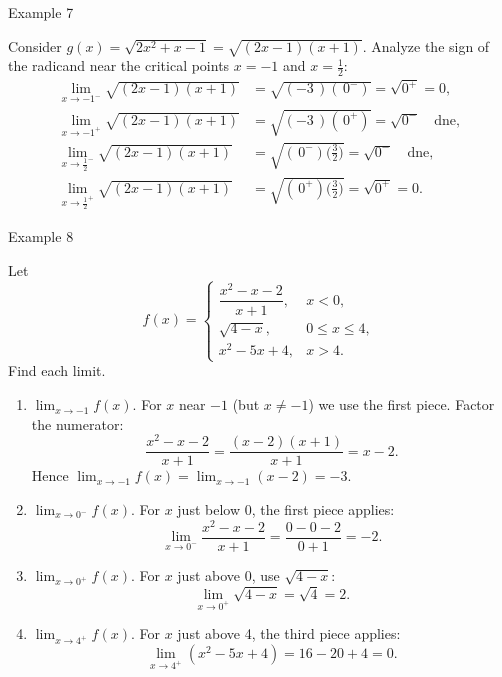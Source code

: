 \begin{examplebox}{Example 7}

Consider \(g(x) = \sqrt{2x^{2} + x - 1} = \sqrt{(2x - 1)(x + 1)}\). Analyze the sign of the radicand near the critical points \(x = -1\) and \(x = \frac{1}{2}\):
\begin{align*}
\lim_{x \to -1^{-}} \sqrt{(2x - 1)(x + 1)}
    &= \sqrt{ ( -3\,)(\,0^{-} ) } = \sqrt{0^{+}} = 0,\\[6pt]
\lim_{x \to -1^{+}} \sqrt{(2x - 1)(x + 1)}
    &= \sqrt{ ( -3\,)(\,0^{+} ) } = \sqrt{0^{-}} \quad \text{dne},\\[6pt]
\lim_{x \to \frac{1}{2}^{-}} \sqrt{(2x - 1)(x + 1)}
    &= \sqrt{ (\,0^{-} )\bigl(\tfrac{3}{2}\bigr) } = \sqrt{0^{-}} \quad \text{dne},\\[6pt]
\lim_{x \to \frac{1}{2}^{+}} \sqrt{(2x - 1)(x + 1)}
    &= \sqrt{ (\,0^{+} )\bigl(\tfrac{3}{2}\bigr) } = \sqrt{0^{+}} = 0.
\end{align*}
\end{examplebox}


\begin{examplebox}{Example 8}

Let
\[
f(x) = \begin{cases}
\dfrac{x^{2} - x - 2}{x + 1}, & x < 0, \\[10pt]
\sqrt{4 - x},                  & 0 \le x \le 4, \\[6pt]
x^{2} - 5x + 4,                & x > 4.
\end{cases}
\]
Find each limit.
\begin{enumerate}
    \item[(a)] \(\displaystyle\lim_{x \to -1} f(x)\).
    For \(x\) near \(-1\) (but \(x \neq -1\)) we use the first piece. Factor the numerator:
    \[
    \frac{x^{2} - x - 2}{x + 1} = \frac{(x - 2)(x + 1)}{x + 1} = x - 2.
    \]
    Hence \(\displaystyle\lim_{x \to -1} f(x) = \lim_{x \to -1} (x - 2) = -3\).

    \item[(b)] \(\displaystyle\lim_{x \to 0^{-}} f(x)\).
    For \(x\) just below 0, the first piece applies:
    \[
    \lim_{x \to 0^{-}} \frac{x^{2} - x - 2}{x + 1} = \frac{0 - 0 - 2}{0 + 1} = -2.
    \]

    \item[(c)] \(\displaystyle\lim_{x \to 0^{+}} f(x)\).
    For \(x\) just above 0, use \(\sqrt{4 - x}\):
    \[
    \lim_{x \to 0^{+}} \sqrt{4 - x} = \sqrt{4} = 2.
    \]

    \item[(d)] \(\displaystyle\lim_{x \to 4^{+}} f(x)\).
    For \(x\) just above 4, the third piece applies:
    \[
    \lim_{x \to 4^{+}} (x^{2} - 5x + 4) = 16 - 20 + 4 = 0.
    \]
\end{enumerate}
\end{examplebox}

